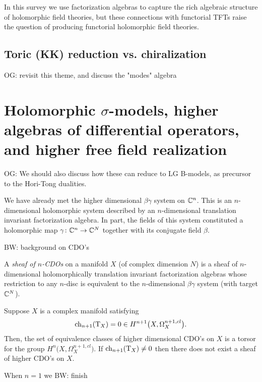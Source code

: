 \documentclass[11pt]{amsart}
\def\brian#1{{\textcolor{blue!65!red}{BW: {#1}}}}
\def\owen#1{{\textcolor{violet!65!black}{OG: {#1}}}}
\begin{document}
In this survey we use factorization algebras to capture the rich algebraic structure of holomorphic field theories,
but these connections with functorial TFTs raise the question of producing functorial holomorphic field theories.


\subsection{Toric (KK) reduction vs. chiralization}

\owen{revisit this theme, and discuss the "modes" algebra}

\section{Holomorphic $\sigma$-models, higher algebras of differential operators, and higher free field realization}

\owen{We should also discuss how these can reduce to LG B-models, as precursor to the Hori-Tong dualities.}

We have already met the higher dimensional $\beta\gamma$ system on $\mathbb C^n$.
This is an $n$-dimensional holomorphic system described by an $n$-dimensional translation invariant factorization algebra.
In part, the fields of this system constituted a holomorphic map $\gamma \colon \mathbb C^n \to \mathbb C^N$ together with its conjugate field $\beta$. 

\brian{background on CDO's}

\begin{dfn}\label{dfn:cdo}
A {\em sheaf of $n$-CDOs} on a manifold $X$ (of complex dimension $N$) is a sheaf of $n$-dimensional holomorphically translation invariant factorization algebras whose restriction to any $n$-disc is equivalent to the $n$-dimensional $\beta\gamma$ system (with target $\mathbb C^N$). 
\end{dfn}

\begin{thm}\label{thm:cdo}
Suppose $X$ is a complex manifold satisfying 
\[
{\rm ch}_{n+1} ({\rm T}_X) = 0 \in H^{n+1} \big(X , \Omega^{n+1,cl}_X\big).
\]
Then, the set of equivalence classes of higher dimensional CDO's on $X$ is a torsor for the group $H^n \big(X , \Omega^{n+1, cl}_X\big)$. 
If ${\rm ch}_{n+1}({\rm T}_X) \ne 0$ then there does not exist a sheaf of higher CDO's on $X$. 
\end{thm}

\begin{rmk}
When $n=1$ we \cite{GGW} \brian{finish}
\end{rmk} 
\end{document}
